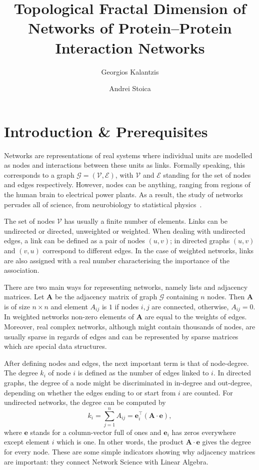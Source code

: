 \documentclass[10pt,twoside]{pnas-new}
\title{Topological  Fractal  Dimension  of  Networks  of Protein–Protein  Interaction  Networks}
\author[a]{Georgios Kalantzis}
\author[a]{Andrei Stoica}
\affil[a]{SABS, DTC}
\begin{document}
\maketitle
\thispagestyle{firststyle}

\section{Introduction \& Prerequisites}
Networks are representations of real systems where individual units are modelled as nodes and interactions between these units as links. Formally speaking, this corresponds to a graph $\mathcal{G} = (\mathcal{V},\mathcal{E})$, with $\mathcal{V}$ and $\mathcal{E}$ standing for the set of nodes and edges respectively. However, nodes can be anything, ranging from regions of the human brain to electrical power plants. As a result, the study of networks pervades all of science, from neurobiology to statistical physics~\cite{strogatz2001exploring}.  

The set of nodes $\mathcal{V}$ has usually a finite number of elements. Links can be undirected or directed, unweighted or weighted. When dealing with undirected edges, a link can be defined as a pair of nodes $(u,v)$; in directed graphs $(u,v)$ and $(v,u)$ correspond to different edges. In the case of weighted networks, links are also assigned with a real number characterising the importance of the association.

There are two main ways for representing networks, namely lists and adjacency matrices. Let $\mathbf{A}$ be the adjacency matrix of graph  $\mathcal{G}$ containing $n$ nodes. Then $\mathbf{A}$ is of size $n\times n$ and element $A_{ij}$ is $1$ if nodes $i,j$ are connected, otherwise, $A_{ij}=0$. In weighted networks non-zero elements of $\mathbf{A}$ are equal to the weights of edges. Moreover, real complex networks, although might contain thousands of nodes, are usually sparse in regards of edges and can be represented by sparse matrices which are special data structures.

After defining nodes and edges, the next important term is that of node-degree. The degree $k_i$ of node $i$ is defined as the number of edges linked to $i$. In directed graphs, the degree of a node might be discriminated in in-degree and out-degree, depending on whether the edges ending to or start from $i$ are counted. For undirected networks, the degree can be computed by
\[ k_i = \sum_{j=1}^{n}A_{ij} = \mathbf{e}_i^\top ( \mathbf{A} \cdot \mathbf{e} ), \]
where  $\mathbf{e}$ stands for a column-vector full of ones and $\mathbf{e}_i$ has zeros everywhere except element $i$ which is one. In other words, the product $ \mathbf{A} \cdot \mathbf{e} $ gives the degree for every node. These are some simple indicators showing why adjacency matrices are important: they connect Network Science with Linear Algebra.
\end{document}
